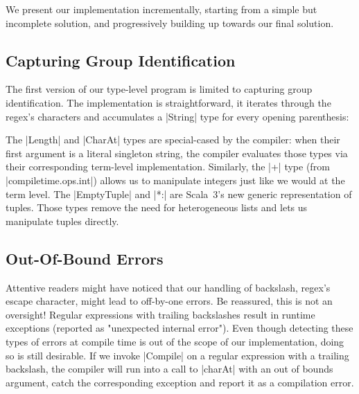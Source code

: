 We present our implementation incrementally, starting from a simple but incomplete solution, and progressively building up towards our final solution.

\subsection{Capturing Group Identification}

The first version of our type-level program is limited to capturing group identification.
The implementation is straightforward, it iterates through the regex's characters and accumulates a |String| type for every opening parenthesis:

\regexFirstIteration
%
%

\noindent
The |Length| and |CharAt| types are special-cased by the compiler: when their first argument is a literal singleton string, the compiler evaluates those types via their corresponding term-level implementation.
Similarly, the |+| type (from |compiletime.ops.int|) allows us to manipulate integers just like we would at the term level.
The |EmptyTuple| and |*:| are Scala~3's new generic representation of tuples.
Those types remove the need for heterogeneous lists and lets us manipulate tuples directly.

\subsection{Out-Of-Bound Errors}

Attentive readers might have noticed that our handling of backslash, regex's escape character, might lead to off-by-one errors.
Be reassured, this is not an oversight!
Regular expressions with trailing backslashes result in runtime exceptions (reported as "unexpected internal error").
Even though detecting these types of errors at compile time is out of the scope of our implementation, doing so is still desirable.
If we invoke |Compile| on a regular expression with a trailing backslash, the compiler will run into a call to |charAt| with an out of bounds argument, catch the corresponding exception and report it as a compilation error.

